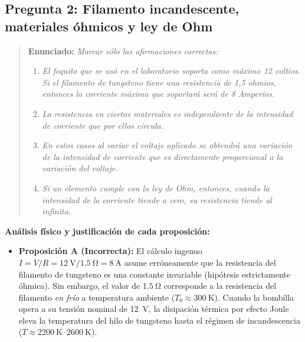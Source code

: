 \begin{appendices}
\subsection{Pregunta 2: Filamento incandescente, materiales óhmicos y ley de Ohm}

\begin{quote}
    \textbf{Enunciado:} \textit{Marcar sólo las afirmaciones correctas:}
    \begin{enumerate}
        \renewcommand{\theenumi}{\Alph{enumi}}
        \renewcommand{\labelenumi}{\textbf{\theenumi.}}
        \item \textit{El foquito que se usó en el laboratorio soporta como máximo 12 voltios. Si el filamento de tungsteno tiene una resistencia de 1,5 ohmios, entonces la corriente máxima que soportará será de 8 Amperios.}
        \item \textit{La resistencia en ciertos materiales es independiente de la intensidad de corriente que por ellos circula.}
        \item \textit{En estos casos al variar el voltaje aplicado se obtendrá una variación de la intensidad de corriente que es directamente proporcional a la variación del voltaje.}
        \item \textit{Si un elemento cumple con la ley de Ohm, entonces, cuando la intensidad de la corriente tiende a cero, su resistencia tiende al infinito.}
    \end{enumerate}
\end{quote}

\textbf{Análisis físico y justificación de cada proposición:}
\begin{itemize}
    \item \textbf{Proposición A (Incorrecta):} El cálculo ingenuo $I = V/R = \qty{12}{\volt} / \qty{1,5}{\ohm} = \qty{8}{\ampere}$ asume erróneamente que la resistencia del filamento de tungsteno es una constante invariable (hipótesis estrictamente óhmica). Sin embargo, el valor de $\qty{1,5}{\ohm}$ corresponde a la resistencia del filamento \textit{en frío} a temperatura ambiente ($T_0 \approx \qty{300}{\kelvin}$). Cuando la bombilla opera a su tensión nominal de \qty{12}{\volt}, la disipación térmica por efecto Joule eleva la temperatura del hilo de tungsteno hasta el régimen de incandescencia ($T \approx \qtyrange{2200}{2600}{\kelvin}$).
    

\end{itemize}
\end{appendices}
